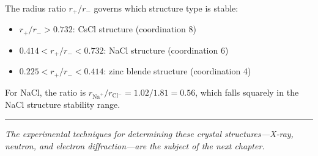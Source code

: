 The radius ratio $r_+/r_-$ governs which structure type is stable:
\begin{itemize}[nosep]
  \item $r_+/r_- > 0.732$: CsCl structure (coordination 8)
  \item $0.414 < r_+/r_- < 0.732$: NaCl structure (coordination 6)
  \item $0.225 < r_+/r_- < 0.414$: zinc blende structure (coordination 4)
\end{itemize}
For NaCl, the ratio is $r_{\text{Na}^+}/r_{\text{Cl}^-} = 1.02/1.81 = 0.56$, which falls squarely in the NaCl structure stability range.

\vspace{1cm}
\noindent\rule{\textwidth}{0.4pt}
\textit{The experimental techniques for determining these crystal structures---X-ray, neutron, and electron diffraction---are the subject of the next chapter.}
